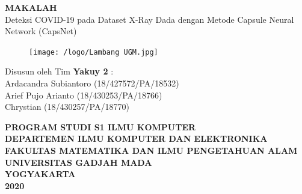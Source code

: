 \documentclass{article}
\begin{document}
  \begin{titlepage}
    \begin{center}
      
      \null
      {
      \huge \bfseries MAKALAH}\\
      [1cm]
      {\LARGE Deteksi COVID-19 pada Dataset X-Ray Dada dengan Metode Capsule Neural Network (CapsNet)}\\
          
      \vspace{2cm}

      \begin{figure}[H]
        \centering
        \texttt{[image: /logo/Lambang UGM.jpg]}
      \end{figure}
          
      \vspace{3cm}
    
      {\Large 
      Disusun oleh Tim \bfseries Yakuy 2} {\Large :\\
      \vspace{0.5cm}
      Ardacandra Subiantoro (18/427572/PA/18532)\\
      Arief Pujo Arianto (18/430253/PA/18766)\\
      Chrystian (18/430257/PA/18770)\\
      }


      \vspace{2cm}

      {\normalsize \bfseries
      PROGRAM STUDI S1 ILMU KOMPUTER\\
      DEPARTEMEN ILMU KOMPUTER DAN ELEKTRONIKA\\
      FAKULTAS MATEMATIKA DAN ILMU PENGETAHUAN ALAM\\
      UNIVERSITAS GADJAH MADA\\
      YOGYAKARTA\\
      \vspace{0.2cm}
      2020
      }
            
    \end{center}
  \end{titlepage}

\end{document}
